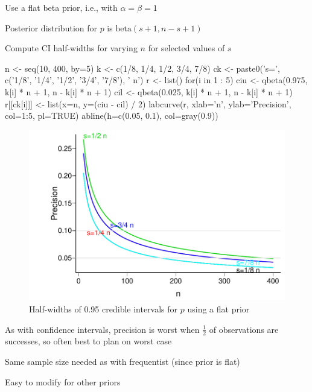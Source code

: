 \bi
\item Use a flat beta prior, i.e., with $\alpha=\beta=1$
\item Posterior distribution for $p$ is $\textrm{beta}(s + 1, n - s + 1)$
\item Compute CI half-widths for varying $n$ for selected values of $s$
\begin{Schunk}
\begin{Sinput}
n <- seq(10, 400, by=5)
k <- c(1/8, 1/4, 1/2, 3/4, 7/8)
ck <- paste0('s=', c('1/8', '1/4', '1/2', '3/4', '7/8'), ' n')
r <- list()
for(i in 1 : 5) {
   ciu <- qbeta(0.975, k[i] * n + 1, n - k[i] * n + 1)
   cil <- qbeta(0.025, k[i] * n + 1, n - k[i] * n + 1)
   r[[ck[i]]] <- list(x=n, y=(ciu - cil) / 2)
}
labcurve(r, xlab='n', ylab='Precision', col=1:5, pl=TRUE)
abline(h=c(0.05, 0.1), col=gray(0.9))
\end{Sinput}
\begin{figure}[htbp]

\centerline{\includegraphics[width=\maxwidth]{htest-pprecb-1} }

\caption[Half-widths of 0.95 credible intervals for $p$ using a flat prior]{Half-widths of 0.95 credible intervals for $p$ using a flat prior}\label{fig:htest-pprecb}
\end{figure}
\end{Schunk}
\item As with confidence intervals, precision is worst when
  $\frac{1}{2}$ of observations are successes, so often best to plan
  on worst case
\item Same sample size needed as with frequentist (since prior is flat)  
\item Easy to modify for other priors
\ei

